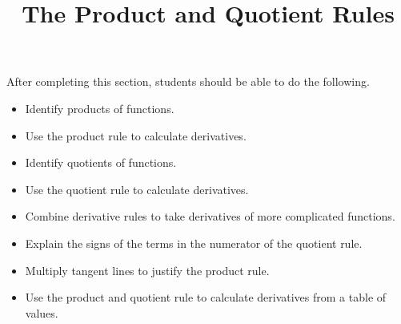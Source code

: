 \documentclass{ximera}
\title{The Product and Quotient Rules}
\begin{document}
\begin{abstract}
\end{abstract}

\maketitle

\begin{sectionOutcomes}

After completing this section, students should be able to do the following.

\begin{itemize}
	\item Identify products of functions.
	\item Use the product rule to calculate derivatives.
	\item Identify quotients of functions.
	\item Use the quotient rule to calculate derivatives.
	\item Combine derivative rules to take derivatives of more complicated functions.
        \item Explain the signs of the terms in the numerator of the quotient rule.
        \item Multiply tangent lines to justify the product rule.
	\item Use the product and quotient rule to calculate derivatives from a table of values.
\end{itemize}

\end{sectionOutcomes}
\end{document}
